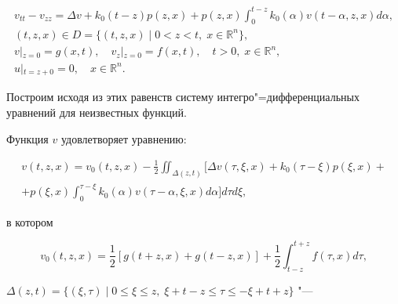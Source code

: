 \begin{gather}

{v_{tt}} - {v_{zz}} = \Delta v + {k_0}(t - z)p(z,x) + p(z,x)\int_0^{t - z}{{k_0}(\alpha )v(t - \alpha ,z,x)d\alpha }, 

\label{dur:5}

\\

(t,z,x) \in D = \{ (t, z, x) \mid 0 < z < t,\; x \in {\mathbb R^n} \},

\\

v\left| {_{z = 0} = g(x,t)} \right.,\quad  {v_z}\left| {_{z = 0} = f(x,t)} \right.,\quad  t > 0, \; x \in {\mathbb R^n},

\label{dur:6}

\\

u| {_{t = z + 0} = 0}, \quad  x \in {\mathbb R^n}.

\label{dur:7}

\end{gather}

Построим  исходя из этих равенств систему интегро"=дифференциальных уравнений для неизвестных функций.

Функция $v$ удовлетворяет уравнению:

\begin{multline}

v(t,z,x) = v_0(t,z,x)  


-\frac 12 \iint_{\Delta (z,t)} \biggl[ \Delta v\left( {\tau ,\xi ,x} \right) +k_0(\tau  - \xi )p(\xi ,x)+

\\

+p(\xi ,x)\int_0^{\tau  - \xi } {{k_0}(\alpha )v(\tau  - \alpha ,\xi ,x)d\alpha } \biggr]d\tau d\xi ,

\label{dur:8}

\end{multline}

в котором

\begin{equation}

{v_0}(t,z,x) = \frac 12 \left[ {g(t + z,x) + g(t - z,x)} \right] + \frac 12 \int_{t - z}^{t + z} f(\tau ,x)d\tau , 

\label{dur:9}

\end{equation}

$\Delta (z,t) = \{ (\xi ,\tau ) \mid 0 \leqslant \xi  \leqslant z,\; \xi  + t - z \leqslant \tau  \leqslant  - \xi  + t + z \}$ "---

